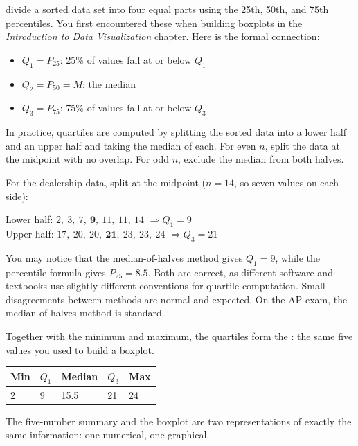  divide a sorted data set into
four equal parts using the 25th, 50th, and 75th percentiles. You
first encountered these when building boxplots in the \textit{Introduction to Data Visualization}
chapter. Here is the formal connection:

\begin{itemize}
    \item $Q_1 = P_{25}$: 25\% of values fall at or below $Q_1$
    \item $Q_2 = P_{50} = M$: the median
    \item $Q_3 = P_{75}$: 75\% of values fall at or below $Q_3$
\end{itemize}

In practice, quartiles are computed by splitting the sorted data into
a lower half and an upper half and taking the median of each. For
even $n$, split the data at the midpoint with no overlap. For odd
$n$, exclude the median from both halves.


For the dealership data, split at the midpoint ($n = 14$, so seven
values on each side):

\begin{center}
Lower half: $2,\ 3,\ 7,\ \mathbf{9},\ 11,\ 11,\ 14$
$\Rightarrow Q_1 = 9$ \\[4pt]
Upper half: $17,\ 20,\ 20,\ \mathbf{21},\ 23,\ 23,\ 24$
$\Rightarrow Q_3 = 21$
\end{center}

You may notice that the median-of-halves method gives $Q_1 = 9$,
while the percentile formula gives $P_{25} = 8.5$. Both are correct, as different software and textbooks use slightly different conventions
for quartile computation. Small disagreements between methods are
normal and expected. On the AP exam, the median-of-halves method is
standard.

Together with the minimum and maximum, the quartiles form the
: the same
five values you used to build a boxplot.

\begin{center}
\begin{tabular}{lllll}
Min & $Q_1$ & Median & $Q_3$ & Max \\
\hline
2 & 9 & 15.5 & 21 & 24 \\
\end{tabular}
\end{center}

The five-number summary and the boxplot are two representations of
exactly the same information: one numerical, one graphical.

